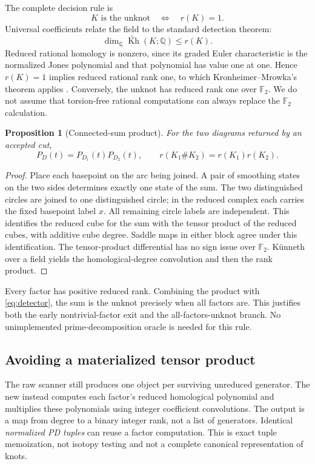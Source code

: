 \documentclass[11pt,a4paper]{article}
\newtheorem{proposition}[theorem]{Proposition}
\theoremstyle{definition}\newtheorem{remark}[theorem]{Remark}
\newcommand{\F}{\mathbb F_2}
\newcommand{\rKh}{\widetilde{\operatorname{Kh}}}
\begin{document}
The complete decision rule is
\begin{equation}
K\text{ is the unknot}\quad\Longleftrightarrow\quad r(K)=1.
\label{eq:detector}
\end{equation}
Universal coefficients relate the field to the standard detection theorem:
\[\dim_{\mathbb Q}\rKh(K;\mathbb Q)\le r(K).\]
Reduced rational homology is
nonzero, since its graded Euler characteristic is the normalized Jones
polynomial and that polynomial has value one at one. Hence $r(K)=1$ implies
reduced rational rank one, to which Kronheimer--Mrowka's theorem applies
\cite{KM}. Conversely, the unknot has reduced rank one over $\F$. We do not
assume that torsion-free rational computations can always replace the $\F$
calculation.

\begin{proposition}[Connected-sum product]
For the two diagrams returned by an accepted cut,
\[
P_D(t)=P_{D_1}(t)P_{D_2}(t),\qquad r(K_1\#K_2)=r(K_1)r(K_2).
\]
\end{proposition}
\begin{proof}
Place each basepoint on the arc being joined. A pair of smoothing states on the
two sides determines exactly one state of the sum. The two distinguished circles
are joined to one distinguished circle; in the reduced complex each carries the
fixed basepoint label $x$. All remaining circle labels are independent. This
identifies the reduced cube for the sum with the tensor product of the reduced
cubes, with additive cube degree. Saddle maps in either block agree under this
identification. The tensor-product differential has no sign issue over $\F$.
K\"unneth over a field yields the homological-degree convolution and then the
rank product.
\end{proof}

Every factor has positive reduced rank. Combining the product with
\eqref{eq:detector}, the sum is the unknot precisely when all factors are.
This justifies both the early nontrivial-factor exit and the all-factors-unknot
branch. No unimplemented prime-decomposition oracle is needed for this rule.

\subsection{Avoiding a materialized tensor product}
The raw scanner still produces one object per surviving unreduced generator.
The new  instead computes each factor's reduced
homological polynomial and multiplies these polynomials using integer
coefficient convolutions. The output is a map from degree to a binary integer
rank, not a list of generators. Identical \emph{normalized PD tuples} can reuse
a factor computation. This is exact tuple memoization, not isotopy testing and
not a complete canonical representation of knots.
\end{document}
